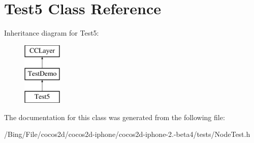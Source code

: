 \hypertarget{interface_test5}{\section{Test5 Class Reference}
\label{interface_test5}
}
Inheritance diagram for Test5\-:\begin{figure}[H]
\begin{center}
\leavevmode
\includegraphics[height=3.000000cm]{interface_test5}
\end{center}
\end{figure}


The documentation for this class was generated from the following file\-:\begin{DoxyCompactItemize}
\item 
/\-Bing/\-File/cocos2d/cocos2d-\/iphone/cocos2d-\/iphone-\/2.-\/beta4/tests/Node\-Test.\-h\end{DoxyCompactItemize}
